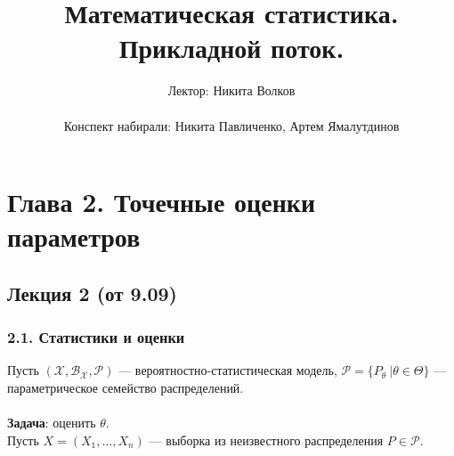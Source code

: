 \documentclass[12pt]{report}
\title{Математическая статистика. Прикладной поток.}
\author{Лектор: Никита Волков \\  \\Конспект набирали: Никита Павличенко, Артем Ямалутдинов}
\theoremstyle{definition}
\begin{document}
\maketitle
{}
%
\thispagestyle{fancy}
\newpage
\tableofcontents
\newpage

\chapter{Глава 2. Точечные оценки параметров}
\section{Лекция 2 (от 9.09)}
\subsection{2.1. Статистики и оценки}
Пусть $(\mathscr{X}, \mathcal{B}_\mathscr{X}, \mathcal{P})$ — вероятностно-статистическая модель, $\mathcal{P} = \{P_\theta \ \vert \theta \in \Theta \}$ — параметрическое семейство распределений.\\\\
\textbf{Задача}: оценить $\theta$.\\
Пусть $X = (X_1, \dots, X_n)$ — выборка из неизвестного распределения $P \in \mathcal{P}$.
\end{document}
